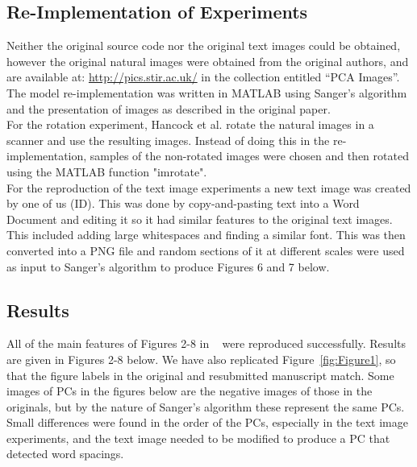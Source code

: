 \subsection{Re-Implementation of Experiments}

Neither the original source code nor the original text images could be obtained, however the original natural images were obtained from the original authors, and are available at: \url{http://pics.stir.ac.uk/} in the collection entitled
``PCA Images''. The model re-implementation was written in MATLAB using Sanger's algorithm and the presentation of images as described in the original paper.\\
For the rotation experiment, Hancock et al. rotate the natural images in a scanner and use the resulting images. Instead of doing this in the re-implementation, samples of the non-rotated images were chosen and then rotated using the MATLAB function "imrotate".\\
For the reproduction of the text image experiments a new text image was created by one of us (ID). This was done by copy-and-pasting text into a Word Document and editing it so it had similar features to the original text images. This included adding large whitespaces and finding a similar font. This was then converted into a PNG file and random sections of it at different scales were used as input to Sanger's algorithm to produce Figures 6 and 7 below. 

\subsection{Results}
All of the main features of Figures 2-8 in ~\cite{Hancock1992-mp} were reproduced successfully. Results are given in Figures 2-8 below. We have also replicated Figure~\ref{fig:Figure1}, so that the figure labels in the original and resubmitted manuscript match.  Some images of PCs in the figures below are the negative images of those in the originals, but by the nature of Sanger's algorithm these represent the same PCs. Small differences were found in the order of the PCs, especially in the text image experiments, and the text image needed to be modified to produce a PC that detected word spacings.




